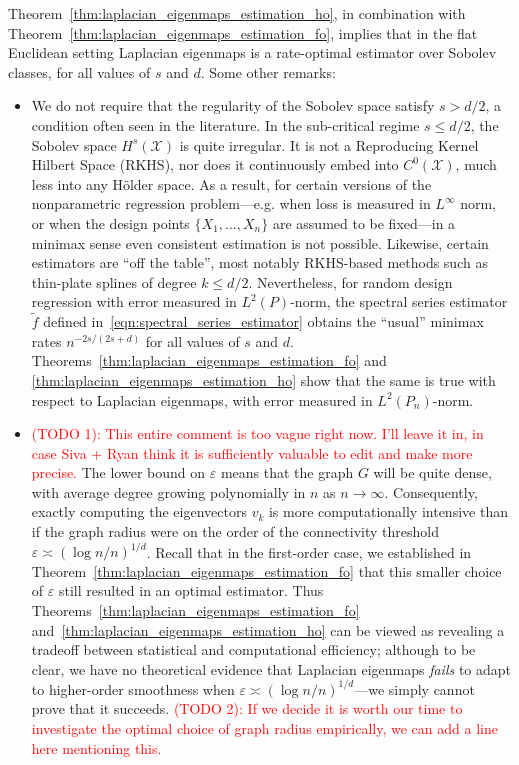 \documentclass{article}
\newcommand{\1}{\mathbf{1}}
\newcommand{\Leb}{L}
\newcommand{\mc}[1]{\mathcal{#1}}
\newcommand{\wt}[1]{\widetilde{#1}}
\theoremstyle{alden}
\theoremstyle{aldenthm}
\theoremstyle{definition}
\theoremstyle{remark}
\begin{document}
Theorem~\ref{thm:laplacian_eigenmaps_estimation_ho}, in combination with Theorem~\ref{thm:laplacian_eigenmaps_estimation_fo}, implies that in the flat Euclidean setting Laplacian eigenmaps is a rate-optimal estimator over Sobolev classes, for all values of $s$ and $d$. Some other remarks:
\begin{itemize}
	\item We do not require that the regularity of the Sobolev space satisfy $s > d/2$, a condition often seen in the literature. In the sub-critical regime $s \leq d/2$, the Sobolev space $H^s(\mc{X})$ is quite irregular. It is not a Reproducing Kernel Hilbert Space (RKHS), nor does it continuously embed into $C^0(\mc{X})$, much less into any H\"{o}lder space. As a result, for certain versions of the nonparametric regression problem---e.g. when loss is measured in $\Leb^{\infty}$ norm, or when the design points $\{X_1,\ldots,X_n\}$ are assumed to be fixed---in a minimax sense even consistent estimation is not possible. Likewise, certain estimators are ``off the table'', most notably RKHS-based methods such as thin-plate splines of degree $k \leq d/2$. Nevertheless, for random design regression with error measured in $\Leb^2(P)$-norm, the spectral series estimator $\wt{f}$ defined in~\eqref{eqn:spectral_series_estimator} obtains the ``usual'' minimax rates $n^{-2s/(2s + d)}$ for all values of $s$ and $d$. Theorems~\ref{thm:laplacian_eigenmaps_estimation_fo} and \ref{thm:laplacian_eigenmaps_estimation_ho} show that the same is true with respect to Laplacian eigenmaps, with error measured in $\Leb^2(P_n)$-norm.
	\item \textcolor{red}{(TODO 1): This entire comment is too vague right now. I'll leave it in, in case Siva + Ryan think it is sufficiently valuable to edit and make more precise.} The lower bound on $\varepsilon$ means that the graph $G$ will be quite dense, with average degree growing polynomially in $n$ as $n \to \infty$. Consequently, exactly computing the eigenvectors $v_k$ is more computationally intensive than if the graph radius were on the order of the connectivity threshold $\varepsilon \asymp (\log n/n)^{1/d}$. Recall that in the first-order case, we established in Theorem~\ref{thm:laplacian_eigenmaps_estimation_fo} that this smaller choice of $\varepsilon$ still resulted in an optimal estimator. Thus Theorems~\ref{thm:laplacian_eigenmaps_estimation_fo} and~\ref{thm:laplacian_eigenmaps_estimation_ho} can be viewed as revealing a tradeoff between statistical and computational efficiency; although to be clear, we have no theoretical evidence that Laplacian eigenmaps \emph{fails} to adapt to higher-order smoothness when $\varepsilon \asymp (\log n/n)^{1/d}$---we simply cannot prove that it succeeds. 
	\textcolor{red}{(TODO 2): If we decide it is worth our time to investigate the optimal choice of graph radius empirically, we can add a line here mentioning this.}
	

\end{itemize}
\end{document}

